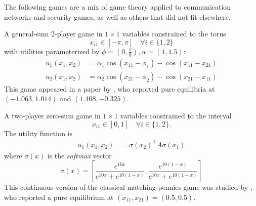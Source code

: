 

The following games are a mix of game theory applied to communication networks and security games, as well as others that did not fit elsewhere.


\begin{game}\label{ex.chasnov20.5.2}
A general-sum 2-player game in $1 \times 1$ variables constrained to the torus
\begin{equation*}
x_{i1} \in [-\pi, \pi] \quad \forall i \in \{1, 2\}
\end{equation*}
with utilities parameterized by $\phi = \left(0, \frac{\pi}{8}\right), \alpha = (1, 1.5)$:
\begin{align*}
u_1(x_1, x_2) &= \alpha_1 \cos(x_{11} − \phi_1) - \cos(x_{11} - x_{21})\\
    u_2(x_1, x_2) &= \alpha_2 \cos(x_{21} − \phi_2) - \cos(x_{21} - x_{11})
\end{align*}
This game appeared in a paper by \textcite[5.2]{chasnov.ratliff.ea:convergence}, who reported  pure equilibria at $(-1.063, 1.014)$ and $(1.408, -0.325)$.
\end{game}

\noindent
\begin{minipage}[c]{0.55\textwidth}
\begin{game}\label{ex.chasnov20.b.1}
A two-player zero-sum game in $1 \times 1$ variables constrained to the interval
$$x_{i1} \in [0,1] \quad \forall i \in \{1, 2\}.$$
The utility function is
\begin{align*}
u_{1}\left( x_{1}, x_{2} \right) &= \sigma(x_2)^\top A \sigma(x_1)
\end{align*}
where $\sigma(x)$ is the \emph{softmax} vector
$$\sigma(x) = \left[\frac{e^{10x}}{e^{10x}+e^{10(1-x)}},\frac{e^{10(1-x)}}{e^{10x}+e^{10(1-x)}}\right]$$
This continuous version of the classical matching-pennies game was studied by \textcite[B.1]{chasnov.ratliff.ea:convergence}, who reported a pure equilibrium at $(x_{11}, x_{21}) = (0.5, 0.5)$.
\end{game}
\strut
\end{minipage}
\hfill
\begin{minipage}[c]{0.35\textwidth}
\end{minipage}



